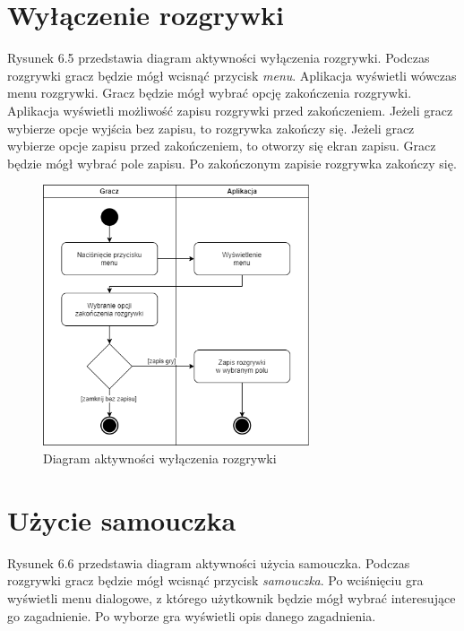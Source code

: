 \clearpage

\section{Wyłączenie rozgrywki}

Rysunek 6.5 przedstawia diagram aktywności wyłączenia rozgrywki.
Podczas rozgrywki gracz będzie mógł wcisnąć przycisk \textit{menu}. Aplikacja wyświetli wówczas menu rozgrywki. Gracz będzie mógł wybrać opcję zakończenia rozgrywki. Aplikacja wyświetli możliwość zapisu rozgrywki przed zakończeniem. Jeżeli gracz wybierze opcje wyjścia bez zapisu, to rozgrywka zakończy się. Jeżeli gracz wybierze opcje zapisu przed zakończeniem, to otworzy się ekran zapisu. Gracz będzie mógł wybrać pole zapisu. Po zakończonym zapisie rozgrywka zakończy się.

\begin{figure}[H]
    \centering
        \includegraphics[width=0.7\textwidth]{Graphics/activities/exit_game.png}
         \caption{Diagram aktywności wyłączenia rozgrywki}
\end{figure}

\clearpage

\section{Użycie samouczka}

Rysunek 6.6 przedstawia diagram aktywności użycia samouczka.
Podczas rozgrywki gracz będzie mógł wcisnąć przycisk \textit{samouczka}. Po wciśnięciu gra wyświetli menu dialogowe, z którego użytkownik będzie mógł wybrać interesujące go zagadnienie. Po wyborze gra wyświetli opis danego zagadnienia.

